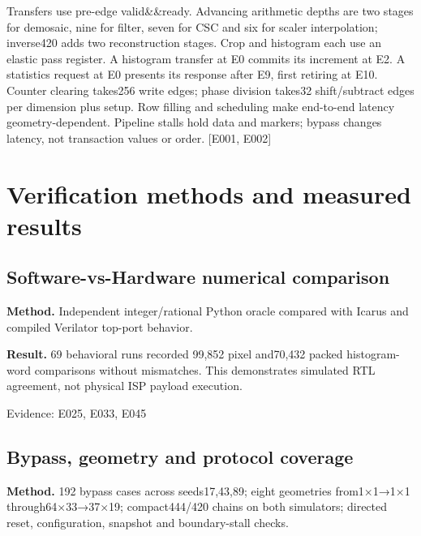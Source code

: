 \documentclass[11pt,a4paper]{article}
\begin{document}
Transfers use pre-edge valid\&\&ready. Advancing arithmetic depths are two stages for demosaic,\allowbreak{} nine for filter,\allowbreak{} seven for CSC and six for scaler interpolation; inverse420 adds two reconstruction stages. Crop and histogram each use an elastic pass register. A histogram transfer at E0 commits its increment at E2. A statistics request at E0 presents its response after E9,\allowbreak{} first retiring at E10. Counter clearing takes256 write edges; phase division takes32 shift/\allowbreak{}subtract edges per dimension plus setup. Row filling and scheduling make end-to-end latency geometry-dependent. Pipeline stalls hold data and markers; bypass changes latency,\allowbreak{} not transaction values or order. [\allowbreak{}E001,\allowbreak{} E002]\allowbreak{}

\section{Verification methods and measured results}

\subsection{Software-vs-Hardware numerical comparison}

\textbf{Method.} Independent integer/\allowbreak{}rational Python oracle compared with Icarus and compiled Verilator top-port behavior.

\textbf{Result.} 69 behavioral runs recorded 99,\allowbreak{}852 pixel and70,\allowbreak{}432 packed histogram-word comparisons without mismatches. This demonstrates simulated RTL agreement,\allowbreak{} not physical ISP payload execution.

{\small Evidence: E025,\allowbreak{} E033,\allowbreak{} E045}

\subsection{Bypass,\allowbreak{} geometry and protocol coverage}

\textbf{Method.} 192 bypass cases across seeds17,\allowbreak{}43,\allowbreak{}89; eight geometries from1{\vulcanmathsymbols ×}1{\vulcanmathsymbols →}1{\vulcanmathsymbols ×}1 through64{\vulcanmathsymbols ×}33{\vulcanmathsymbols →}37{\vulcanmathsymbols ×}19; compact444/\allowbreak{}420 chains on both simulators; directed reset,\allowbreak{} configuration,\allowbreak{} snapshot and boundary-stall checks.
\end{document}
